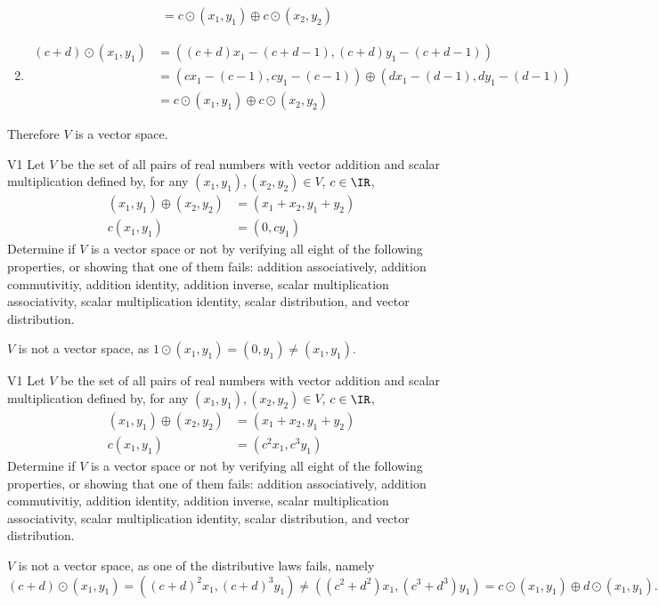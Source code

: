 \begin{solution}
\begin{enumerate}[1)]
\begin{align*}
&=c \odot (x_1,y_1) \oplus c\odot (x_2,y_2)
\end{align*}
\item \begin{align*} (c+d) \odot (x_1,y_1) &=
\left( (c+d)x_1-(c+d-1), (c+d)y_1-(c+d-1) \right) \\
&= \left( cx_1-(c-1), cy_1-(c-1) \right) \oplus (dx_1-(d-1), dy_1-(d-1) ) \\
&= c\odot (x_1,y_1) \oplus c \odot (x_2,y_2)
\end{align*}
\end{enumerate}
Therefore $V$ is a vector space.
\end{solution}

\begin{problem}{V1}
Let $V$ be the set of all pairs of real numbers with vector addition
and scalar multiplication defined by, for any $(x_1,y_1), (x_2,y_2) \in V$, $c \in \IR$,
\begin{align*}
(x_1,y_1) \oplus (x_2,y_2) &= (x_1+x_2,y_1+y_2) \\
c (x_1,y_1) &= (0, cy_1)
\end{align*}
Determine if $V$ is a vector space or not by verifying all eight of the
following properties, or showing that one of them fails: addition associatively,
addition commutivitiy, addition identity, addition inverse,
scalar multiplication associativity, scalar multiplication identity,
scalar distribution, and vector distribution.
\end{problem}
\begin{solution}
$V$ is not a vector space, as $1 \odot (x_1,y_1) = (0,y_1) \neq (x_1,y_1)$.
\end{solution}


\begin{problem}{V1}
Let $V$ be the set of all pairs of real numbers with vector addition
and scalar multiplication defined by, for any $(x_1,y_1), (x_2,y_2) \in V$, $c \in \IR$,
\begin{align*}
(x_1,y_1) \oplus (x_2,y_2) &= (x_1+x_2,y_1+y_2) \\
c (x_1,y_1) &= (c^2x_1, c^3y_1)
\end{align*}
Determine if $V$ is a vector space or not by verifying all eight of the
following properties, or showing that one of them fails: addition associatively,
addition commutivitiy, addition identity, addition inverse,
scalar multiplication associativity, scalar multiplication identity,
scalar distribution, and vector distribution.
\end{problem}
\begin{solution}
$V$ is not a vector space, as one of the distributive laws fails, namely
$$(c+d) \odot (x_1,y_1) = ( (c+d)^2 x_1, (c+d)^3 y_1) \neq ((c^2+d^2)x_1, (c^3+d^3)y_1) = c \odot (x_1,y_1) \oplus d \odot (x_1,y_1).$$
\end{solution}


